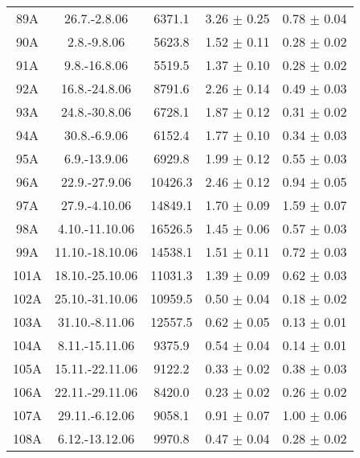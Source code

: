 \documentclass[a4paper,12pt]{article}
\begin{document}
\begin{center}
\begin{longtable}{|c|c|c|c|c|}
    89A &       26.7.-2.8.06    &       6371.1  &       3.26 $\pm$ 0.25 &       0.78 $\pm$ 0.04 \\
    90A &       2.8.-9.8.06     &       5623.8  &       1.52 $\pm$ 0.11 &       0.28 $\pm$ 0.02 \\
    91A &       9.8.-16.8.06    &       5519.5  &       1.37 $\pm$ 0.10 &       0.28 $\pm$ 0.02 \\
    92A &       16.8.-24.8.06   &       8791.6  &       2.26 $\pm$ 0.14 &       0.49 $\pm$ 0.03 \\
    93A &       24.8.-30.8.06   &       6728.1  &       1.87 $\pm$ 0.12 &       0.31 $\pm$ 0.02 \\
    94A &       30.8.-6.9.06    &       6152.4  &       1.77 $\pm$ 0.10 &       0.34 $\pm$ 0.03 \\
    95A &       6.9.-13.9.06    &       6929.8  &       1.99 $\pm$ 0.12 &       0.55 $\pm$ 0.03 \\
    96A &       22.9.-27.9.06   &       10426.3 &       2.46 $\pm$ 0.12 &       0.94 $\pm$ 0.05 \\
    97A &       27.9.-4.10.06   &       14849.1 &       1.70 $\pm$ 0.09 &       1.59 $\pm$ 0.07 \\
    98A &       4.10.-11.10.06  &       16526.5 &       1.45 $\pm$ 0.06 &       0.57 $\pm$ 0.03 \\
    99A &       11.10.-18.10.06 &       14538.1 &       1.51 $\pm$ 0.11 &       0.72 $\pm$ 0.03 \\
    101A &      18.10.-25.10.06 &       11031.3 &       1.39 $\pm$ 0.09 &       0.62 $\pm$ 0.03 \\
    102A &      25.10.-31.10.06 &       10959.5 &       0.50 $\pm$ 0.04 &       0.18 $\pm$ 0.02 \\
    103A &      31.10.-8.11.06  &       12557.5 &       0.62 $\pm$ 0.05 &       0.13 $\pm$ 0.01 \\
    104A &      8.11.-15.11.06  &       9375.9  &       0.54 $\pm$ 0.04 &       0.14 $\pm$ 0.01 \\
    105A &      15.11.-22.11.06 &       9122.2  &       0.33 $\pm$ 0.02 &       0.38 $\pm$ 0.03 \\
    106A &      22.11.-29.11.06 &       8420.0  &       0.23 $\pm$ 0.02 &       0.26 $\pm$ 0.02 \\
    107A &      29.11.-6.12.06  &       9058.1  &       0.91 $\pm$ 0.07 &       1.00 $\pm$ 0.06 \\
    108A &      6.12.-13.12.06  &       9970.8  &       0.47 $\pm$ 0.04 &       0.28 $\pm$ 0.02 \\

\end{longtable}
\end{center}
\end{document}
